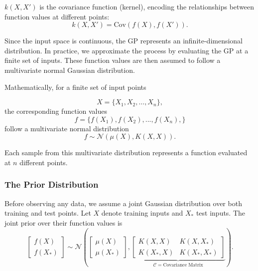 \documentclass[11pt]{article}
\begin{document}
\noindent
 \( k(X, X') \) is the covariance function (kernel), encoding the relationships between function values at different points:
\begin{equation}
    k(X, X') = \text{Cov}(f(X), f(X')).
    \label{eq: kerneldef}
\end{equation}

\noindent
Since the input space is continuous, the GP represents an infinite-dimensional distribution. 
In practice, we approximate the process by evaluating the GP at a finite set of inputs.
These function values are then assumed to follow a multivariate normal Gaussian distribution.

\noindent
Mathematically, for a finite set of input points

\begin{equation}
X = \{X_1, X_2, \dots, X_n\},
\end{equation}
 the corresponding function values
\begin{equation}
f = \{f(X_1),f(X_2),...,f(X_n), \}
\end{equation}
follow a multivariate normal distribution
\begin{equation}
f \sim \mathcal{N}\left(\mu(X), K(X, X)\right).
\label{eq: Multivariate_distribution}
\end{equation}

\noindent
Each sample from this multivariate distribution represents a function evaluated at \( n \) different points.

\subsubsection*{The Prior Distribution}
\label{sec: prior_dist}

Before observing any data, we assume a joint Gaussian distribution over both training and test points. Let \( X \) denote training inputs and \( X_* \) test inputs. 
The joint prior over their function values is
\begin{equation}
\begin{bmatrix}
f(X) \\
f(X_*)
\end{bmatrix}
\sim \mathcal{N}
\left(
\begin{bmatrix}
\mu(X) \\
\mu(X_*)
\end{bmatrix},
\underbrace{
\begin{bmatrix}
K(X, X) & K(X, X_*) \\
K(X_*, X) & K(X_*, X_*)
\end{bmatrix}
}_{\mathcal{C} = \text{Covariance Matrix}}
\right).
\label{eq: Multivariate prior}
\end{equation}
\end{document}
